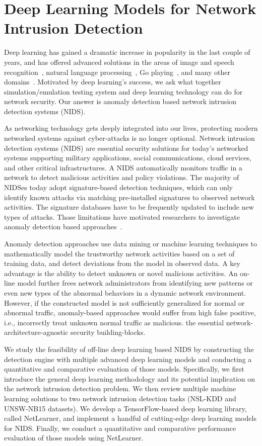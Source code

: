 \section{Deep Learning Models for Network Intrusion Detection}
\label{CDL:Sec:Intro}

Deep learning has gained a dramatic increase in popularity in the last couple of years,
and has offered advanced solutions in the areas of image and speech recognition~\cite{AlexNet, SpeechDNN},
natural language processing~\cite{Word2Vec}, Go playing~\cite{AlphaGo}, and many other domains~\cite{DeepLearning}. 
Motivated by deep learning's success, we ask what together simulation/emulation testing system and deep learning technology can do for network security.
Our answer is anomaly detection based network intrusion detection systems (NIDS).

As networking technology gets deeply integrated into our lives, protecting modern networked systems against cyber-attacks is no longer optional.
Network intrusion detection systems (NIDS) are essential security solutions for today's networked systems supporting military applications,
social communications, cloud services, and other critical infrastructures.
A NIDS automatically monitors traffic in a network to detect malicious activities and policy violations.
The majority of NIDSes today adopt signature-based detection techniques,
which can only identify known attacks via matching pre-installed signatures to observed network activities. 
The signature databases have to be frequently updated to include new types of attacks.
Those limitations have motivated researchers to investigate anomaly detection based approaches~\cite{STL-NIDS, LOF, RankingOutliner, NB-Tree, RampLossKSVCR, GAA-ADS}. 

Anomaly detection approaches use data mining or machine learning techniques to mathematically model the trustworthy network activities based on a set of training data,
and detect deviations from the model in observed data. A key advantage is the ability to detect unknown or novel malicious activities.
An on-line model further frees network administrators from identifying new patterns or even new types of the abnormal behaviors in a dynamic network environment.
However, if the constructed model is not sufficiently generalized for normal or abnormal traffic,
anomaly-based approaches would suffer from high false positive, i.e., incorrectly treat unknown normal traffic as malicious.
the essential network-architecture-agnostic security building-blocks.

We study the feasibility of off-line deep learning based NIDS by constructing the detection engine with
multiple advanced deep learning models and conducting a quantitative and comparative evaluation of those models.
Specifically, we first introduce the general deep learning methodology and its potential implication on the network intrusion detection problem.
We then review multiple machine learning solutions to two network intrusion detection tasks (NSL-KDD and UNSW-NB15 datasets).
We develop a TensorFlow-based deep learning library, called NetLearner, and implement a handful of cutting-edge deep learning models for NIDS.
Finally, we conduct a quantitative and comparative performance evaluation of those models using NetLearner. 

